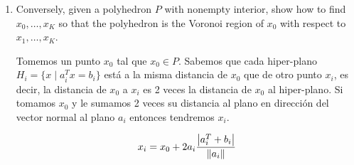 \begin{enumerate}[label=(\alph*)]
    \item Conversely, given a polyhedron $P$ with nonempty interior, show how to find $x_0, \dots, x_K$
        so that the polyhedron is the Voronoi region of $x_0$ with respect to $x_1,\dots,x_K$.

        Tomemos un punto $x_0$ tal que $x_0\in P$. Sabemos que cada hiper-plano $H_i = \{x \mid a_i^Tx = b_i\}$
        está a la misma distancia de $x_0$ que de otro punto $x_i$, es decir,
        la distancia de $x_0$ a $x_i$ es 2 veces la distancia de $x_0$ al hiper-plano.
        Si tomamos $x_0$ y le sumamos 2 veces su distancia al plano en dirección del vector normal al plano $a_i$
        entonces tendremos $x_i$.

        \[ x_i = x_0 + 2a_i\frac{\abs{a_i^T + b_i}}{\norm{a_i}} \]





\end{enumerate}
